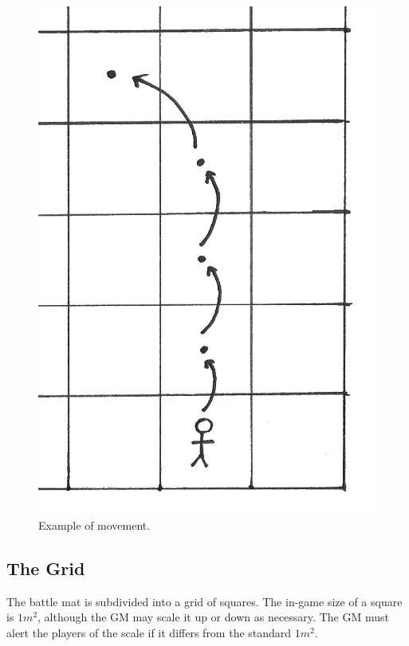 \begin{figure}
    \centering
    \includegraphics{graphics/movement-trans.png}
    \caption{Example of movement.}
    \label{fig:movement}
\end{figure}

\subsection{The Grid}
The battle mat is subdivided into a grid of squares. 
The in-game size of a square is $1m^2$, although the GM may scale it up or down as necessary.
The GM must alert the players of the scale if it differs from the standard $1m^2$.




